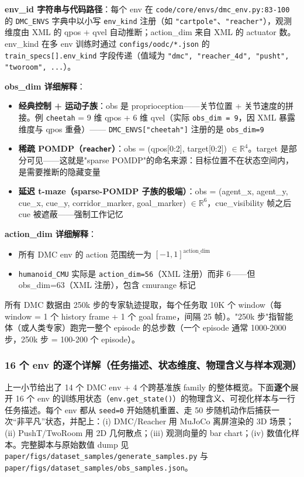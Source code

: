 \documentclass[11pt,a4paper]{article}
\begin{document}
\textbf{env\_id 字符串与代码路径}：每个 env 在 \texttt{code/core/envs/dmc\_env.py:83-100} 的 \texttt{DMC\_ENVS} 字典中以小写 \texttt{env\_kind} 注册（如 \texttt{"cartpole"}、\texttt{"reacher"}），观测维度由 XML 的 qpos + qvel 自动推断；action\_dim 来自 XML 的 actuator 数。env\_kind 在多 env 训练时通过 \texttt{configs/oodc/*.json} 的 \texttt{train\_specs[].env\_kind} 字段传递（值域为 \texttt{"dmc", "reacher\_4d", "pusht", "tworoom", ...}）。

\textbf{obs\_dim 详细解释}：
\begin{itemize}[leftmargin=2em]
    \item \textbf{经典控制 + 运动子族}：obs 是 proprioception——关节位置 + 关节速度的拼接。例 \texttt{cheetah} = 9 维 qpos + 6 维 qvel（实际 \texttt{obs\_dim = 9}，因 XML 暴露维度与 qpos 重叠）—— \texttt{DMC\_ENVS["cheetah"]} 注册的是 \texttt{obs\_dim=9}
    \item \textbf{稀疏 POMDP（\texttt{reacher}）}：obs = (qpos[0:2], target[0:2]) $\in \mathbb{R}^4$。target 是部分可见——这就是"sparse POMDP"的命名来源：目标位置不在状态空间内，是需要推断的隐藏变量
    \item \textbf{延迟 t-maze（sparse-POMDP 子族的极端）}：obs = (agent\_x, agent\_y, cue\_x, cue\_y, corridor\_marker, goal\_marker) $\in \mathbb{R}^6$，cue\_visibility 帧之后 cue 被遮蔽——强制工作记忆
\end{itemize}

\textbf{action\_dim 详细解释}：
\begin{itemize}[leftmargin=2em]
    \item 所有 DMC env 的 action 范围统一为 $[-1, 1]^{\text{action\_dim}}$
    \item \texttt{humanoid\_CMU} 实际是 \texttt{action\_dim=56}（XML 注册）而非 6——但 obs\_dim=63（XML 注册），包含 cmurange 标记
\end{itemize}

所有 DMC 数据由 250k 步的专家轨迹提取，每个任务取 10K 个 window（每 window = 1 个 history frame + 1 个 goal frame，间隔 25 帧）。"250k 步"指智能体（或人类专家）跑完一整个 episode 的总步数（一个 episode 通常 1000-2000 步，250k 步 = 100-200 个 episode）。
\subsubsection{16 个 env 的逐个详解（任务描述、状态维度、物理含义与样本观测）}

上一小节给出了 14 个 DMC env + 4 个跨基准族 family 的整体概览。下面\textbf{逐个}展开 16 个 env 的训练用状态（\texttt{env.get\_state()}）的物理含义、可视化样本与一行任务描述。每个 env 都从 \texttt{seed=0} 开始随机重置、走 50 步随机动作后捕获一次``非平凡''状态，并配上：(i) DMC/Reacher 用 MuJoCo 离屏渲染的 3D 场景；(ii) PushT/TwoRoom 用 2D 几何散点；(iii) 观测向量的 bar chart；(iv) 数值化样本。完整脚本与原始数值 dump 见 \texttt{paper/figs/dataset\_samples/generate\_samples.py} 与 \texttt{paper/figs/dataset\_samples/obs\_samples.json}。
\end{document}
